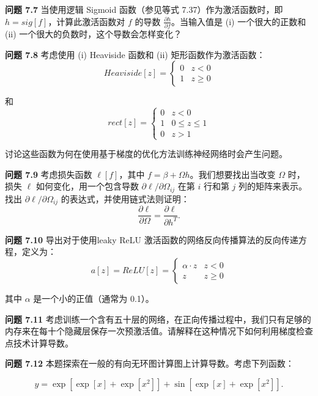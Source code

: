 \documentclass[lang=cn,newtx,10pt,scheme=chinese]{elegantbook}
\begin{document}
\textbf{问题 7.7} 当使用逻辑 Sigmoid 函数（参见等式 7.37）作为激活函数时，即 \(h = sig[f]\)，计算此激活函数对 \(f\) 的导数 \(\frac{\partial h}{\partial f}\)。当输入值是 (i) 一个很大的正数和 (ii) 一个很大的负数时，这个导数会怎样变化？

\textbf{问题 7.8} 考虑使用 (i) Heaviside 函数和 (ii) 矩形函数作为激活函数：
\begin{equation}
Heaviside[z] = \begin{cases}
0 & z < 0 \\
1 & z \geq 0
\end{cases} 
\end{equation}

和
\begin{equation}
rect[z] = \begin{cases}
0 & z < 0 \\
1 & 0 \leq z \leq 1 \\
0 & z > 1
\end{cases} 
\end{equation}

讨论这些函数为何在使用基于梯度的优化方法训练神经网络时会产生问题。

\textbf{问题 7.9} 考虑损失函数 \(\ell[f]\)，其中 \(f = \beta + \Omega h\)。我们想要找出当改变 \(\Omega\) 时，损失 \(\ell\) 如何变化，用一个包含导数 \(\partial\ell/\partial\Omega_{ij}\) 在第 \(i\) 行和第 \(j\) 列的矩阵来表示。找出 \(\partial\ell/\partial\Omega_{ij}\) 的表达式，并使用链式法则证明：
\begin{equation}
\frac{\partial \ell}{\partial \Omega} = \frac{\partial \ell}{\partial h^T}. 
\end{equation}

\textbf{问题 7.10} 导出对于使用leaky ReLU 激活函数的网络反向传播算法的反向传递方程，定义为：
\begin{equation}
a[z] = ReLU[z] = \begin{cases}
\alpha \cdot z & z < 0 \\
z & z \geq 0
\end{cases} 
\end{equation}

其中 \(\alpha\) 是一个小的正值（通常为 0.1）。

\textbf{问题 7.11} 考虑训练一个含有五十层的网络，在正向传播过程中，我们只有足够的内存来在每十个隐藏层保存一次预激活值。请解释在这种情况下如何利用梯度检查点技术计算导数。

\textbf{问题 7.12} 本题探索在一般的有向无环图计算图上计算导数。考虑下列函数：

\begin{equation}
y = \exp [\exp[x] + \exp[x^2]] + \sin[\exp[x] + \exp[x^2]]. 
\end{equation}
\end{document}
